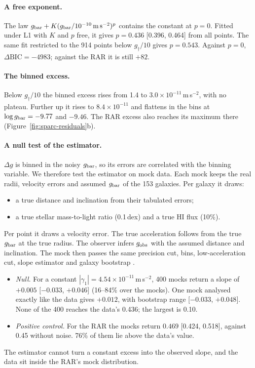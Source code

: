 \paragraph{A free exponent.} The law $g_{\rm bar}+K(g_{\rm bar}/10^{-10}\,{\rm m\,s^{-2}})^p$ contains the constant at $p=0$. Fitted under
L1 with $K$ and $p$ free, it gives $p=0.436$ [0.396, 0.464] from all points. The same fit restricted to the 914 points below
$g_\dagger/10$ gives $p=0.543$. Against $p=0$, $\Delta\mathrm{BIC}=-4983$; against the RAR it is still $+82$.

\paragraph{The binned excess.} Below $g_\dagger/10$ the binned excess rises from 1.4 to $3.0\times10^{-11}$\,m\,s$^{-2}$, with no
plateau. Further up it rises to $8.4\times10^{-11}$ and flattens in the bins at $\log g_{\rm bar}=-9.77$ and $-9.46$. The RAR excess also
reaches its maximum there (Figure~\ref{fig:sparc-residuals}b).

\paragraph{A null test of the estimator.} $\Delta g$ is binned in the noisy $g_{\rm bar}$, so its errors are correlated with the
binning variable. We therefore test the estimator on mock data. Each mock keeps the real radii, velocity errors and assumed $g_{\rm bar}$
of the 153 galaxies. Per galaxy it draws:
\begin{itemize}[nosep]
\item a true distance and inclination from their tabulated errors;
\item a true stellar mass-to-light ratio (0.1\,dex) and a true HI flux (10\%).
\end{itemize}
Per point it draws a velocity error. The true acceleration follows from the true $g_{\rm bar}$ at the true radius. The observer infers
$g_{\rm obs}$ with the assumed distance and inclination. The mock then passes the same precision cut, bins, low-acceleration cut, slope
estimator and galaxy bootstrap .
\begin{itemize}[nosep]
\item \emph{Null.} For a constant $|\gamma_1|=4.54\times10^{-11}$\,m\,s$^{-2}$, 400 mocks return a slope of $+0.005$ [$-0.033$, $+0.046$]
(16--84\% over the mocks). One mock analysed exactly like the data gives $+0.012$, with bootstrap range [$-0.033$, $+0.048$]. None of the
400 reaches the data's 0.436; the largest is 0.10.
\item \emph{Positive control.} For the RAR the mocks return $0.469$ [0.424, 0.518], against 0.45 without noise. 76\% of them lie above
the data's value.
\end{itemize}
The estimator cannot turn a constant excess into the observed slope, and the data sit inside the RAR's mock distribution.

